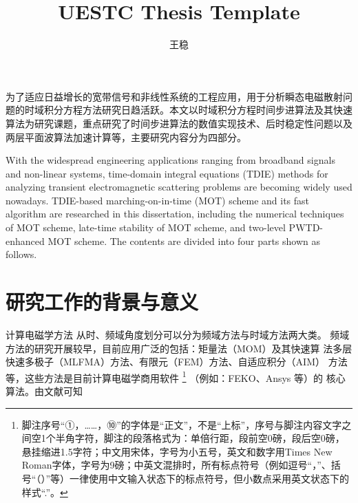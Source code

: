 \documentclass[doctor]{thesisUESTC}
\title{UESTC Thesis Template}
\author{王稳}
\begin{document}
\setcounter{page}{1}
\begin{chineseabstract}
为了适应日益增长的宽带信号和非线性系统的工程应用，用于分析瞬态电磁散射问题的时域积分方程方法研究日趋活跃。本文以时域积分方程时间步进算法及其快速算法为研究课题，重点研究了时间步进算法的数值实现技术、后时稳定性问题以及两层平面波算法加速计算等，主要研究内容分为四部分。

\end{chineseabstract}



\begin{englishabstract}
With the widespread engineering applications ranging from broadband signals and non-linear systems, time-domain integral equations (TDIE) methods for analyzing transient electromagnetic scattering problems are becoming widely used nowadays. TDIE-based marching-on-in-time (MOT) scheme and its fast algorithm are researched in this dissertation, including the numerical techniques of MOT scheme, late-time stability of MOT scheme, and two-level PWTD-enhanced MOT scheme. The contents are divided into four parts shown as follows.

\end{englishabstract}

\thesistableofcontents

\thesischapterexordium
\section{研究工作的背景与意义}
计算电磁学方法
从时、频域角度划分可以分为频域方法与时域方法两大类。
频域方法的研究开展较早，目前应用广泛的包括：矩量法（MOM）及其快速算
法多层快速多极子（MLFMA）方法、有限元（FEM）方法、自适应积分（AIM）
方法等，这些方法是目前计算电磁学商用软件
\footnote{脚注序号“①，……，⑩”的字体是“正文”，不是“上标”，序号与脚注内容文字之间空1个半角字符，脚注的段落格式为：单倍行距，段前空0磅，段后空0磅，悬挂缩进1.5字符；中文用宋体，字号为小五号，英文和数字用Times New Roman字体，字号为9磅；中英文混排时，所有标点符号（例如逗号“，”、括号“（）”等）一律使用中文输入状态下的标点符号，但小数点采用英文状态下的样式“.”。}
（例如：FEKO、Ansys 等）的
核心算法。由文献\cite{bibson}可知
\end{document}
